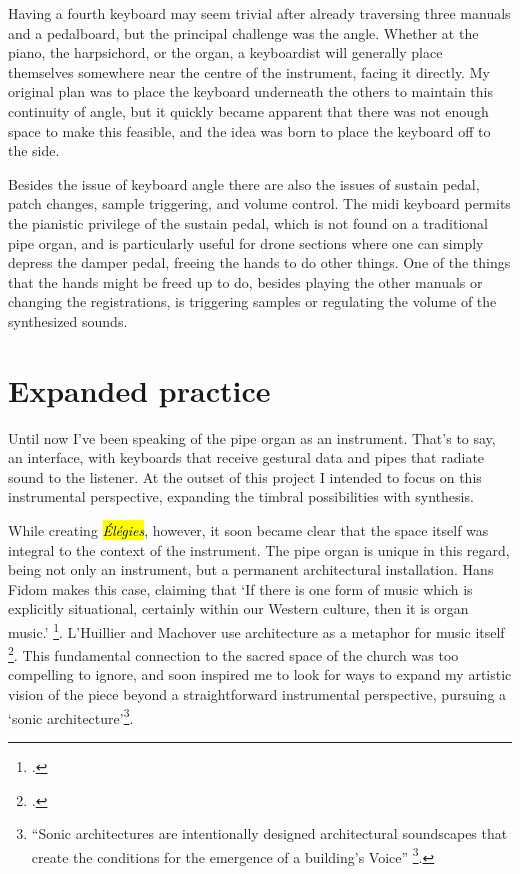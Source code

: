 \documentclass[12pt,twoside,maitrise]{dms_ks}
\theoremstyle{definition}
\begin{document}
{{Having a fourth keyboard may seem trivial after already traversing three manuals and a pedalboard, but the principal challenge was the angle. 
Whether at the piano, the harpsichord, or the organ, a keyboardist will generally place themselves somewhere near the centre of the instrument, facing it directly. 
My original plan was to place the keyboard underneath the others to maintain this continuity of angle, but it quickly became apparent that there was not enough space to make this feasible, and the idea was born to place the keyboard off to the side. 

Besides the issue of keyboard angle there are also the issues of sustain pedal, patch changes, sample triggering, and volume control. 
The midi keyboard permits the pianistic privilege of the sustain pedal, which is not found on a traditional pipe organ, and is particularly useful for drone sections where one can simply depress the damper pedal, freeing the hands to do other things. 
One of the things that the hands might be freed up to do, besides playing the other manuals or changing the registrations, is triggering samples or regulating the volume of the synthesized sounds. 

\section{Expanded practice}

Until now I've been speaking of the pipe organ as an instrument. 
That's to say, an interface, with keyboards that receive gestural data and pipes that radiate sound to the listener. 
At the outset of this project I intended to focus on this instrumental perspective, expanding the timbral possibilities with synthesis.

While creating \hl{\textit{Élégies}}, however, it soon became clear that the space itself was integral to the context of the instrument. 
The pipe organ is unique in this regard, being not only an instrument, but a permanent architectural installation. 
Hans Fidom makes this case, claiming that `If there is one form of music which is explicitly situational, certainly within our Western culture, then it is organ music.' \footcite[23]{fidom_music_2012}. 
L'Huillier and Machover use architecture as a metaphor for music itself \footcite[361]{lhuillier_spaces_2018}. 
This fundamental connection to the sacred space of the church was too compelling to ignore, and soon inspired me to look for ways to expand my artistic vision of the piece beyond a straightforward instrumental perspective, pursuing a `sonic architecture'\footnote{“Sonic architectures are intentionally designed architectural soundscapes that create the conditions for the emergence of a building’s Voice” \footcite[2]{lacey_site-specific_2014}.}.

}}
\end{document}
